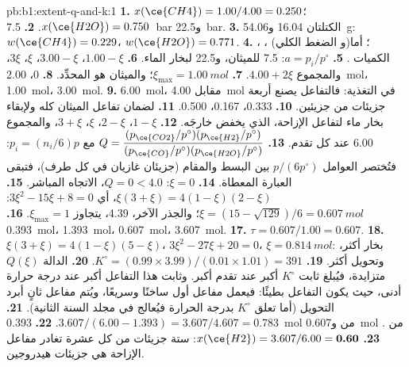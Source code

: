 \begin{solution}{pb:b1:extent-q-and-k:1}
\textbf{1.} $x(\ce{CH4}) = 1.00/4.00 = 0.250$؛ $x(\ce{H2O}) = 0.750$.
\textbf{2.} \qty{7.5}{bar} و\qty{22.5}{bar}.
\textbf{3.} الكتلتان 16.04 و\qty{54.06}{g}: $w(\ce{CH4}) = 0.229$،
$w(\ce{H2O}) = 0.771$.
\textbf{4.} ، ،  (و
الضغط الكلي)؛ أما الكميات .
\textbf{5.} $a = p_i/p^\circ$: 7.5 للميثان، و22.5 لبخار الماء.
\textbf{6.}  $1.00 - \xi$،  $3.00 - \xi$،  $\xi$،
 $3\xi$، والمجموع $4.00 + 2\xi$.
\textbf{7.} $\xi_{\max} = \qty{1.00}{mol}$؛ والميثان هو المحدِّد.
\textbf{8.}  0،  \qty{2.00}{mol}،  \qty{1.00}{mol}،
 \qty{3.00}{mol}.
\textbf{9.} \qty{6.00}{mol}، مقابل \qty{4.00}{mol} في التغذية: فالتفاعل
يصنع أربعة جزيئات من جزيئين.
\textbf{10.}  0.333،  0.167،  0.500.
\textbf{11.} لضمان تفاعل الميثان كله ولإبقاء بخار ماء
لتفاعل الإزاحة، الذي يخفض خارجَه.
\textbf{12.}  $1 - \xi$،  $2 - \xi$،  $\xi$، 
$3 + \xi$، والمجموع 6.00 عند كل تقدم.
\textbf{13.} $Q = \dfrac{(p_{\ce{CO2}}/p^\circ)(p_{\ce{H2}}/p^\circ)}
{(p_{\ce{CO}}/p^\circ)(p_{\ce{H2O}}/p^\circ)}$ مع $p_i = (n_i/6)p$: فتُختصر
العوامل $p/(6p^\circ)$ بين البسط والمقام (جزيئان غازيان
في كل طرف)، فتبقى العبارة المعطاة.
\textbf{14.} $\xi = 0$: $Q = 0 < 4.0$، الاتجاه المباشر.
\textbf{15.} $\xi(3 + \xi) = 4(1 - \xi)(2 - \xi)$، أي $3\xi^2 - 15\xi +
8 = 0$: $\xi = (15 - \sqrt{129})/6 = \qty{0.607}{mol}$؛ والجذر الآخر،
4.39، يتجاوز $\xi_{\max} = 1$.
\textbf{16.}  \qty{0.393}{mol}،  \qty{1.393}{mol}،
 \qty{0.607}{mol}،  \qty{3.607}{mol}.
\textbf{17.} $\tau = 0.607/1.00 = 0.607$.
\textbf{18.} $\xi(3 + \xi) = 4(1 - \xi)(5 - \xi)$، $3\xi^2 - 27\xi + 20 =
0$، $\xi = \qty{0.814}{mol}$: بخار أكثر، وتحويل أكثر.
\textbf{19.} $K^\circ = (0.99 \times 3.99)/(0.01 \times 1.01) = 391$.
\textbf{20.} الدالة $Q(\xi)$ متزايدة، فيُبلغ ثابت $K^\circ$ أكبر عند
تقدم أكبر. وثابت هذا التفاعل أكبر عند درجة
حرارة أدنى، حيث يكون التفاعل بطيئًا: فيعمل مفاعل أول ساخنًا
وسريعًا، ويُتم مفاعل ثانٍ أبرد التحويل (أما تعلق
$K^\circ$ بدرجة الحرارة فيُعالج في مجلد السنة الثانية).
\textbf{21.} $3.607/(6.00 - 1.393) = 3.607/4.607 = 0.783$.
\textbf{22.} \qty{0.393}{mol} من  و\qty{0.607}{mol} من .
\textbf{23.} $x(\ce{H2}) = 3.607/6.00 = \textbf{0.60}$: ستة جزيئات من كل
عشرة تغادر مفاعل الإزاحة هي جزيئات هيدروجين.
\end{solution}
